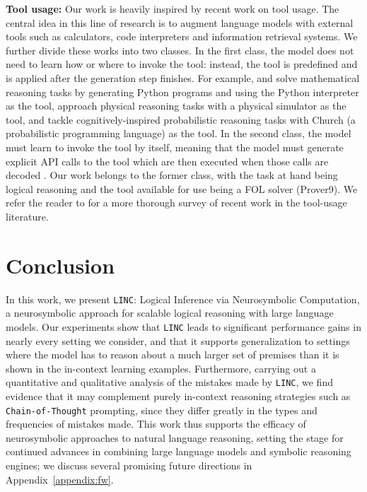\documentclass[11pt]{article}
\begin{document}
\textbf{Tool usage:} Our work is heavily inspired by recent work on tool usage. The central idea in this line of research is to augment language models with external tools such as calculators, code interpreters and information retrieval systems. We further divide these works into two classes. In the first class, the model does not need to learn how or where to invoke the tool: instead, the tool is predefined and is applied after the generation step finishes. For example, \citet{gao2023pal} and \citet{drori2022neural} solve mathematical reasoning tasks by generating Python programs and using the Python interpreter as the tool, \citet{liu2023mind} approach physical reasoning tasks with a physical simulator as the tool, and \citet{wong2023word} tackle cognitively-inspired probabilistic reasoning tasks with Church (a probabilistic programming language) as the tool. In the second class, the model must learn to invoke the tool by itself, meaning that the model must generate explicit API calls to the tool which are then executed when those calls are decoded \citep{schick2023toolformer, thoppilan2022lamda, yao2022react, cheng2023binding}. Our work belongs to the former class, with the task at hand being logical reasoning and the tool available for use being a FOL solver (Prover9). We refer the reader to \citet{mialon2023augmented} for a more thorough survey of recent work in the tool-usage literature.

\section{Conclusion}

In this work, we present \texttt{LINC}: Logical Inference via Neurosymbolic Computation, a neurosymbolic approach for scalable logical reasoning with large language models. 
Our experiments show that \texttt{LINC} leads to significant performance gains in nearly every setting we consider, and that it supports generalization to settings where the model has to reason about a much larger set of premises than it is shown in the in-context learning examples.
Furthermore, carrying out a quantitative and qualitative analysis of the mistakes made by \texttt{LINC}, we find evidence that it may complement purely in-context reasoning strategies such as \texttt{Chain-of-Thought} prompting, since they differ greatly in the types and frequencies of mistakes made.
This work thus supports the efficacy of neurosymbolic approaches to natural language reasoning, setting the stage for continued advances in combining large language models and symbolic reasoning engines; we discuss several promising future directions in Appendix~\ref{appendix:fw}.
\end{document}
